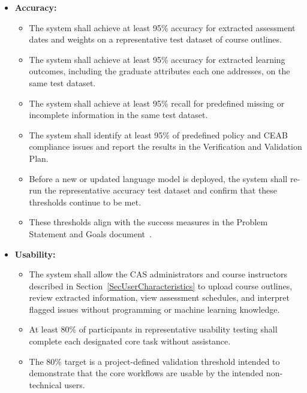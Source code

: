 \documentclass[12pt]{article}
\newcounter{nfrnum} %
\begin{document}
\noindent \begin{itemize}
\renewcommand{\labelitemii}{\textbullet}

\item[NFR\refstepcounter{nfrnum}\thenfrnum \label{NFR_Accuracy}:]
\textbf{Accuracy:}
\begin{itemize}
    \item The system shall achieve at least 95\% accuracy for extracted assessment dates and
    weights on a representative test dataset of course outlines.
    \item The system shall achieve at least 95\% accuracy for extracted learning outcomes,
    including the graduate attributes each one addresses, on the same test dataset.
    \item The system shall achieve at least 95\% recall for predefined missing or incomplete
    information in the same test dataset.
    \item The system shall identify at least 95\% of predefined policy and CEAB compliance
    issues and report the results in the Verification and Validation Plan.
    \item Before a new or updated language model is deployed, the system shall
    re-run the representative accuracy test dataset and confirm that these
    thresholds continue to be met.
    \item These thresholds align with the success measures in the Problem Statement and
    Goals document~\citep{TeamBVSH2026PS}.
\end{itemize}

\item[NFR\refstepcounter{nfrnum}\thenfrnum \label{NFR_Usability}:]
\textbf{Usability:}
\begin{itemize}
    \item The system shall allow the CAS administrators and course instructors described in
    Section~\ref{SecUserCharacteristics} to upload course outlines, review extracted information,
    view assessment schedules, and interpret flagged issues without programming or machine
    learning knowledge.
    \item At least 80\% of participants in representative usability testing shall complete
    each designated core task without assistance.
    \item The 80\% target is a project-defined validation threshold intended to demonstrate
    that the core workflows are usable by the intended non-technical users.
\end{itemize}


\end{itemize}
\end{document}
